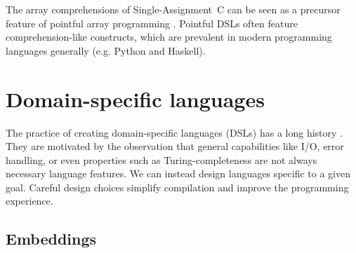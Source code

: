 The array comprehensions of Single-Assignment~C can be seen as a precursor feature of pointful array programming \cite{scholz1994single}. Pointful DSLs often feature comprehension-like constructs, which are prevalent in modern programming languages generally (e.g. Python and Haskell). 






\section{Domain-specific languages}
\label{domain-specific-languages}

The practice of creating domain-specific languages (DSLs) has a long history \cite{hudak1996building}. They are motivated by the observation that general capabilities like I/O, error handling, or even properties such as Turing-completeness are not always necessary language features. We can instead design languages specific to a given goal. Careful design choices simplify compilation and improve the programming experience.

\subsection{Embeddings}

